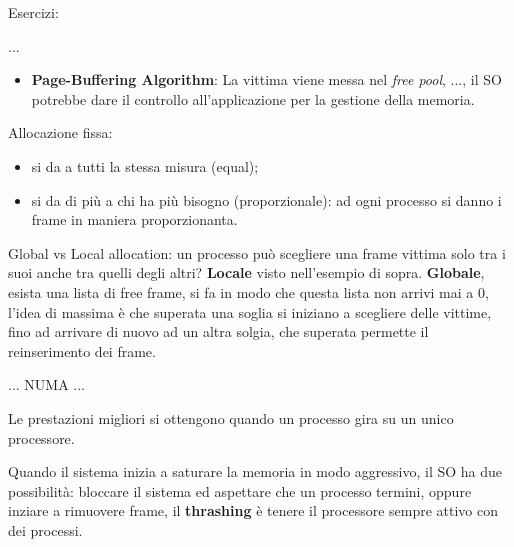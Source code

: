 \documentclass[12pt]{article}
\begin{document}
Esercizi:
\begin{example}{}{}
    ...
\end{example}

\begin{itemize}
  \item \textbf{Page-Buffering Algorithm}: La vittima viene messa nel \emph{free pool}, ..., il SO potrebbe dare il controllo all'applicazione per la gestione della memoria.

\end{itemize}


Allocazione fissa:
\begin{itemize}
  \item si da a tutti la stessa misura (equal);
  \item si da di pi\`u a chi ha pi\`u bisogno (proporzionale): ad ogni processo si danno i frame in maniera proporzionanta.
\end{itemize}

Global vs Local allocation: un processo pu\`o scegliere una frame vittima solo tra i suoi anche tra quelli degli altri? \textbf{Locale} visto nell'esempio di sopra. \textbf{Globale}, esista una lista di free frame, si fa in modo che questa lista non arrivi mai a 0, l'idea di massima \`e che superata una soglia si iniziano a scegliere delle vittime, fino ad arrivare di nuovo ad un altra solgia, che superata permette il reinserimento dei frame.

... NUMA ...

Le prestazioni migliori si ottengono quando un processo gira su un unico processore.

Quando il sistema inizia a saturare la memoria in modo aggressivo, il SO ha due possibilit\`a: bloccare il sistema ed aspettare che un processo termini, oppure inziare a rimuovere frame, il \textbf{thrashing} \`e tenere il processore sempre attivo con dei processi.
\end{document}
